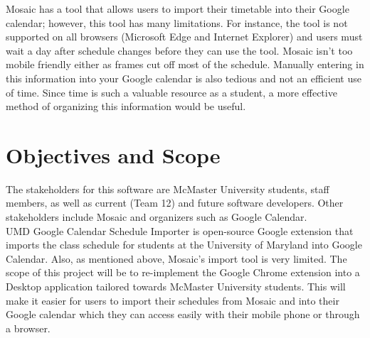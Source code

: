 \documentclass{article}
\begin{document}
Mosaic has a tool that allows users to import their timetable into their Google calendar; however, this tool has many limitations. For instance, the tool is not supported on all browsers (Microsoft Edge and Internet Explorer) and users must wait a day after schedule changes before they can use the tool. Mosaic isn’t too mobile friendly either as frames cut off most of the schedule. Manually entering in this information into your Google calendar is also tedious and not an efficient use of time. Since time is such a valuable resource as a student, a more effective method of organizing this information would be useful.


\section{Objectives and Scope}
\hspace{5mm}The stakeholders for this software are McMaster University students, staff members, as well as current (Team 12) and future software developers. Other stakeholders include Mosaic and organizers such as Google Calendar.\\

UMD Google Calendar Schedule Importer is open-source Google extension that imports the class schedule for students at the University of Maryland into Google Calendar. Also, as mentioned above, Mosaic’s import tool is very limited. The scope of this project will be to re-implement the Google Chrome extension into a  Desktop application tailored towards McMaster University students. This will make it easier for users to import their schedules from Mosaic and into their Google calendar which they can access easily with their mobile phone or through a browser.






\end{document}
